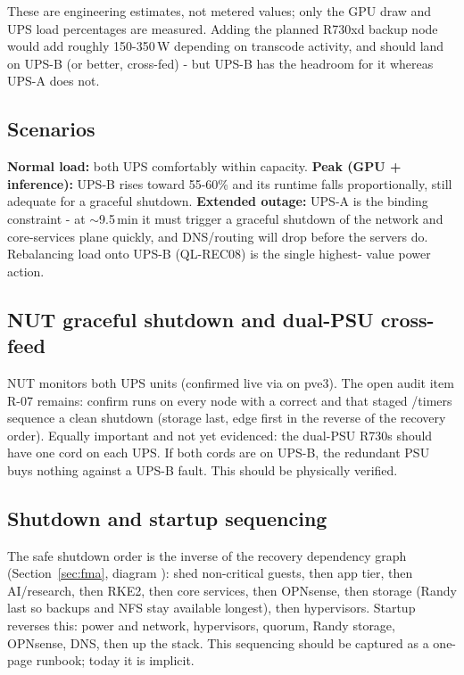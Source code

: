 These are engineering estimates, not metered values; only the GPU draw and UPS load
percentages are measured. Adding the planned R730xd backup node would add roughly
150-350\,W depending on transcode activity, and should land on UPS-B (or better, cross-fed)
- but UPS-B has the headroom for it whereas UPS-A does not.

\subsection{Scenarios}

\textbf{Normal load:} both UPS comfortably within capacity. \textbf{Peak (GPU + inference):}
UPS-B rises toward 55-60\% and its runtime falls proportionally, still adequate for a graceful
shutdown. \textbf{Extended outage:} UPS-A is the binding constraint - at $\sim$9.5\,min it must
trigger a graceful shutdown of the network and core-services plane quickly, and DNS/routing
will drop before the servers do. Rebalancing load onto UPS-B (QL-REC08) is the single highest-
value power action.

\subsection{NUT graceful shutdown and dual-PSU cross-feed}

NUT monitors both UPS units (confirmed live via  on pve3). The open audit item
R-07 remains: confirm  runs on every node with a correct  and
that staged /timers sequence a clean shutdown (storage last, edge first in the
reverse of the recovery order). Equally important and not yet evidenced: the dual-PSU R730s
should have one cord on each UPS. If both cords are on UPS-B, the redundant PSU buys nothing
against a UPS-B fault. This should be physically verified.

\subsection{Shutdown and startup sequencing}

The safe shutdown order is the inverse of the recovery dependency graph
(Section~\ref{sec:fma}, diagram ): shed non-critical
guests, then app tier, then AI/research, then RKE2, then core services, then OPNsense, then
storage (Randy last so backups and NFS stay available longest), then hypervisors. Startup
reverses this: power and network, hypervisors, quorum, Randy storage, OPNsense, DNS, then up
the stack. This sequencing should be captured as a one-page runbook; today it is implicit.

